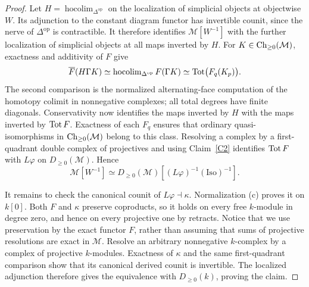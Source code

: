 \begin{proof}
Let $H=\operatorname{hocolim}_{\Delta^{\mathrm{op}}}$ on the localization of simplicial objects at objectwise $W$. Its adjunction to the constant diagram functor has invertible counit, since the nerve of $\Delta^{\mathrm{op}}$ is contractible. It therefore identifies $\mathcal M[W^{-1}]$ with the further localization of simplicial objects at all maps inverted by $H$. For $K\in\operatorname{Ch}_{\geq0}(\mathcal M)$, exactness and additivity of $F$ give
\[
 \overline F(H\Gamma K)
 \simeq\operatorname{hocolim}_{\Delta^{\mathrm{op}}}F(\Gamma K)
 \simeq\operatorname{Tot}\bigl(F_q(K_p)\bigr).
\]
The second comparison is the normalized alternating-face computation of the homotopy colimit in nonnegative complexes; all total degrees have finite diagonals. Conservativity now identifies the maps inverted by $H$ with the maps inverted by $\operatorname{Tot} F$. Exactness of each $F_q$ ensures that ordinary quasi-isomorphisms in $\operatorname{Ch}_{\geq0}(\mathcal M)$ belong to this class. Resolving a complex by a first-quadrant double complex of projectives and using Claim~\ref{C2} identifies $\operatorname{Tot} F$ with $L\varphi$ on $D_{\geq0}(\mathcal M)$. Hence
\[
 \mathcal M[W^{-1}]
 \simeq D_{\geq0}(\mathcal M)
       [(L\varphi)^{-1}(\mathrm{Iso})^{-1}].
\]

It remains to check the canonical counit of $L\varphi\dashv\kappa$. Normalization (c) proves it on $k[0]$. Both $F$ and $\kappa$ preserve coproducts, so it holds on every free $k$-module in degree zero, and hence on every projective one by retracts. Notice that we use preservation by the exact functor $F$, rather than assuming that sums of projective resolutions are exact in $\mathcal M$. Resolve an arbitrary nonnegative $k$-complex by a complex of projective $k$-modules. Exactness of $\kappa$ and the same first-quadrant comparison show that its canonical derived counit is invertible. The localized adjunction therefore gives the equivalence with $D_{\geq0}(k)$, proving the claim.
\end{proof}

